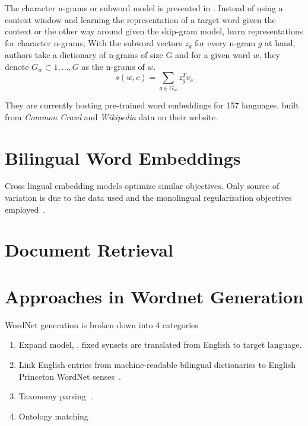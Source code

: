 The character n-grams or subword model is presented in .
Instead of using a context window and learning the representation of a target word given the context or the other way around given the skip-gram model, \citeauthor{bojanowski_enriching_2016} learn representations for character n-grams;
With the subword vectors $z_g$ for every n-gram $g$ at hand, authors take a dictionary of n-grams of size G and for a given word $w$, they denote $G_{w} \subset {1, \dots, G}$ as the n-grams of $w$.
\begin{displaymath}
    s(w,c) = \sum_{g \in G_{w}}z_{g}^T v_c
\end{displaymath}

They are currently hosting pre-trained word embeddings for 157 languages, built from \emph{Common Crawl} and \emph{Wikipedia} data on their website.

\section{Bilingual Word Embeddings}%
\label{sec:bilingual_word_embeddings}

Cross lingual embedding models optimize similar objectives.
Only source of variation is due to the data used and the monolingual regularization objectives employed~\cite{ruder_survey_2017}.

\section{Document Retrieval}%
\label{sec:document_retrieval}

\section{Approaches in Wordnet Generation}%
\label{sec:approaches_in_wordnet_generation}

WordNet generation is broken down into 4 categories
\begin{enumerate}
    \item Expand model, \textcite{vossen_introduction_1998}, fixed synsets are translated from English to target language.
    \item Link English entries from machine-readable bilingual dictionaries to English Princeton WordNet senses~\textcite{knight_building_1994}.
    \item Taxonomy parsing~\textcite{farreres_using_1998}.
    \item Ontology matching~\textcite{farreres_towards_2004}
\end{enumerate}

